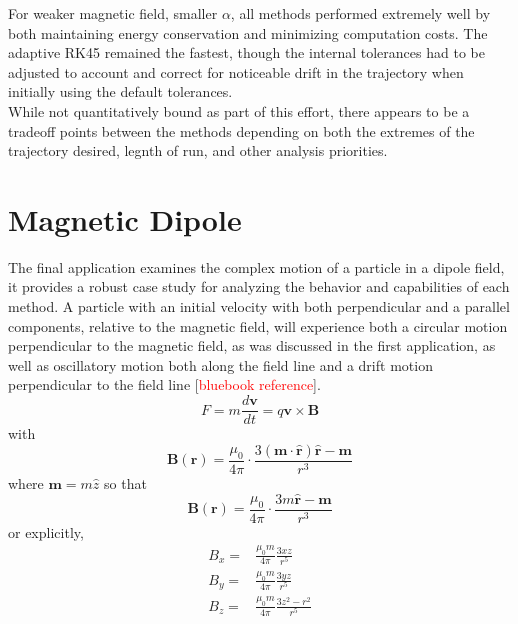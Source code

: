 \documentclass{article}
\begin{document}
For weaker magnetic field, smaller $\alpha$, all methods performed extremely well by both maintaining energy conservation and minimizing computation costs. The adaptive RK45 remained the fastest, though the internal tolerances had to be adjusted to account and correct for noticeable drift in the trajectory when initially using the default tolerances.   \\


While not quantitatively bound as part of this effort, there appears to be a tradeoff points between the methods depending on both the extremes of the trajectory desired, legnth of run, and other analysis priorities.

\section{Magnetic Dipole}
The final application examines the complex motion of a particle in a dipole field, it provides a robust case study for analyzing the behavior and capabilities of each method. A particle with an initial velocity with both perpendicular and a parallel components, relative to the magnetic field, will experience both a circular motion perpendicular to the magnetic field, as was discussed in the first application, as well as oscillatory motion both along the field line and a drift motion perpendicular to the field line [\textcolor{red}{bluebook reference}].
\begin{equation}   
        F=m\frac{d\mathbf{v}}{dt}=q\mathbf{v}\times\mathbf{B}
    \end{equation}
with 
    \begin{equation} 
        \mathbf{B(r)}=\frac{\mu_0}{4\pi}\cdot\frac{3(\mathbf{m\cdot\hat{r}})\mathbf{\hat{r}}-\mathbf{m}}{r^3}
    \end{equation}
where $\mathbf{m}=m\hat{z}$ so that 
    \begin{equation}
        \mathbf{B(r)}=\frac{\mu_0}{4\pi}\cdot\frac{3m\mathbf{\hat{r}}-\mathbf{m}}{r^3}
    \end{equation}
or explicitly,
    \begin{align}
        B_x=&\frac{\mu_0m}{4\pi}\frac{3xz}{r^5}\\
        B_y=&\frac{\mu_0m}{4\pi}\frac{3yz}{r^5}\\
        B_z=&\frac{\mu_0m}{4\pi}\frac{3z^2-r^2}{r^5}
    \end{align}
\end{document}
